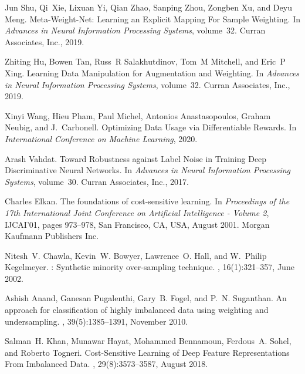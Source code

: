 \documentclass{article}
\begin{document}
\begin{thebibliography}{10}
  Jun Shu, Qi~Xie, Lixuan Yi, Qian Zhao, Sanping Zhou, Zongben Xu, and Deyu Meng.
  \newblock Meta-{{Weight}}-{{Net}}: Learning an {{Explicit Mapping For Sample
    Weighting}}.
  \newblock In {\em Advances in {{Neural Information Processing Systems}}},
    volume~32. {Curran Associates, Inc.}, 2019.
  
  Zhiting Hu, Bowen Tan, Russ~R Salakhutdinov, Tom~M Mitchell, and Eric~P Xing.
  \newblock Learning {{Data Manipulation}} for {{Augmentation}} and
    {{Weighting}}.
  \newblock In {\em Advances in {{Neural Information Processing Systems}}},
    volume~32. {Curran Associates, Inc.}, 2019.
  
  Xinyi Wang, Hieu Pham, Paul Michel, Antonios Anastasopoulos, Graham Neubig, and
    J.~Carbonell.
  \newblock Optimizing {{Data Usage}} via {{Differentiable Rewards}}.
  \newblock In {\em International {{Conference}} on {{Machine Learning}}}, 2020.
  
  Arash Vahdat.
  \newblock Toward {{Robustness}} against {{Label Noise}} in {{Training Deep
    Discriminative Neural Networks}}.
  \newblock In {\em Advances in {{Neural Information Processing Systems}}},
    volume~30. {Curran Associates, Inc.}, 2017.
  
  Charles Elkan.
  \newblock The foundations of cost-sensitive learning.
  \newblock In {\em Proceedings of the 17th International Joint Conference on
    {{Artificial}} Intelligence - {{Volume}} 2}, {{IJCAI}}'01, pages 973--978,
    {San Francisco, CA, USA}, August 2001. {Morgan Kaufmann Publishers Inc.}
  
  Nitesh~V. Chawla, Kevin~W. Bowyer, Lawrence~O. Hall, and W.~Philip Kegelmeyer.
  : Synthetic minority over-sampling technique.
  , 16(1):321--357,
    June 2002.
  
  Ashish Anand, Ganesan Pugalenthi, Gary~B. Fogel, and P.~N. Suganthan.
  \newblock An approach for classification of highly imbalanced data using
    weighting and undersampling.
  , 39(5):1385--1391, November 2010.
  
  Salman~H. Khan, Munawar Hayat, Mohammed Bennamoun, Ferdous~A. Sohel, and
    Roberto Togneri.
  \newblock Cost-{{Sensitive Learning}} of {{Deep Feature Representations From
    Imbalanced Data}}.
  ,
    29(8):3573--3587, August 2018.
  

\end{thebibliography}
\end{document}
